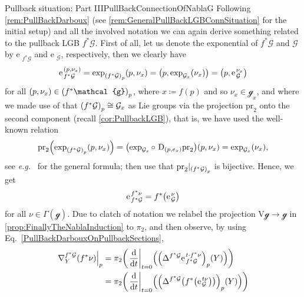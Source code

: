 \documentclass[reqno,a4paper,oneside]{amsart}
\newcommand{\e}{\ensuremath{\mathrm{e\;\!}}}
\theoremstyle{plain}
\theoremstyle{remark}
\theoremstyle{definition}
\begin{document}
\begin{remarks}{Pullback situation: Part III}{PullBackConnectionOfNablaG}
Following \ref{rem:PullBackDarboux} (see \ref{rem:GeneralPullBackLGBConnSituation} for the initial setup) and all the involved notation we can again derive something related to the pullback LGB $f^*\mathcal{G}$. First of all, let us denote the exponential of $f^*\mathcal{G}$ and $\mathcal{G}$ by $\e_{f^*\mathcal{G}}$ and $\e_{\mathcal{G}}$, respectively, then we clearly have
\begin{equation*}
\e_{f^*\mathcal{G}}^{(p, \nu_x)}
=
\exp_{\mleft(f^*\mathcal{G}\mright)_p}(p, \nu_x)
=
\mleft( p, \exp_{\mathcal{G}_x}(\nu_x) \mright)
=
\mleft( p, \e_{\mathcal{G}}^{\nu_x} \mright)
\end{equation*}
for all $(p, \nu_x) \in \mleft(f^*\mathcal{g}\mright)_p$, where $x \coloneqq f(p)$ and so $\nu_x \in \mathcal{g}_x$, and where we made use of that $\mleft(f^*\mathcal{G}\mright)_p \cong \mathcal{G}_x$ as Lie groups via the projection $\mathrm{pr}_2$ onto the second component (recall \ref{cor:PullbackLGB}), that is, we have used the well-known relation
\begin{equation*}
\mathrm{pr}_2\mleft( \exp_{\mleft(f^*\mathcal{G}\mright)_p}(p, \nu_x) \mright)
=
\mleft(\exp_{\mathcal{G}_x} \circ~ \mathrm{D}_{(p, e_x)}\mathrm{pr}_2\mright)(p, \nu_x)
=
\exp_{\mathcal{G}_x}(\nu_x),
\end{equation*}
see \textit{e.g.}\ \cite[\S 1.7, Thm.\ 1.7.16, page 59]{Hamilton} for the general formula; then use that $\mathrm{pr}_2|_{\mleft( f^*\mathcal{G} \mright)_p}$ is bijective. Hence, we get
\begin{equation*}
\e_{f^*\mathcal{G}}^{f^*\nu}
=
f^*\mleft( \e_{\mathcal{G}}^\nu \mright)
\end{equation*}
for all $\nu \in \Gamma(\mathcal{g})$. Due to clatch of notation we relabel the projection $\mathrm{V}\mathcal{g} \to \mathcal{g}$ in \ref{prop:FinallyTheNablaInduction} to $\pi_2$, and then observe, by using Eq.\ \eqref{PullBackDarbouxOnPullbackSections},
\begin{align*}
\mleft.\nabla^{f^*\mathcal{G}}_Y (f^*\nu)\mright|_p
&=
\pi_2 \mleft(
\mleft.\frac{\mathrm{d}}{\mathrm{d}t}\mright|_{t=0} \Bigl( \mleft(\Delta^{f^*\mathcal{G}} \e_{f^*\mathcal{G}}^{t \cdot f^*\nu}\mright)_p (Y) \Bigr)
\mright)
\\
&=
\pi_2 \mleft(
\mleft.\frac{\mathrm{d}}{\mathrm{d}t}\mright|_{t=0} \Bigl( \mleft(\Delta^{f^*\mathcal{G}} \bigl( f^*\mleft( \e_{\mathcal{G}}^{t\nu} \mright) \bigr) \mright)_p (Y) \Bigr)
\mright)

\end{align*}
\end{remarks}
\end{document}
